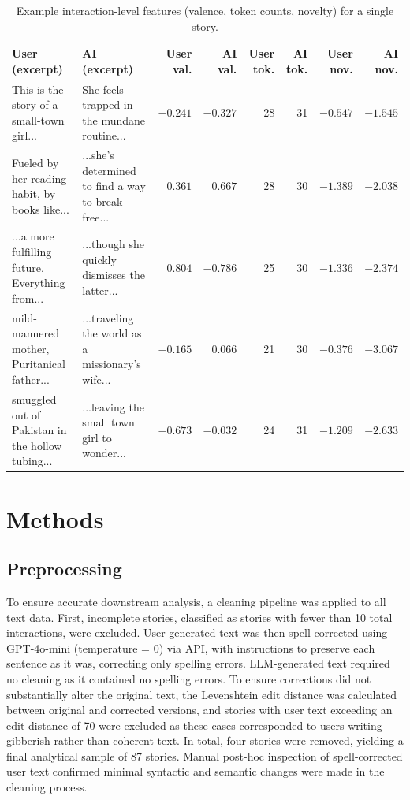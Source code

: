 \documentclass[11pt]{article}
\begin{document}
\begin{table}[t]
\centering
\scriptsize
\setlength{\tabcolsep}{3pt}
\renewcommand{\arraystretch}{1.15}
\begin{tabular}{p{} p{} r r r r r r}
\toprule
\textbf{User (excerpt)} & \textbf{AI (excerpt)} &
\textbf{User val.} & \textbf{AI val.} &
\textbf{User tok.} & \textbf{AI tok.} &
\textbf{User nov.} & \textbf{AI nov.} \\
\midrule
This is the story of a small-town girl... &
She feels trapped in the mundane routine... &
$-0.241$ & $-0.327$ & 28 & 31 & $-0.547$ & $-1.545$ \\
Fueled by her reading habit, by books like... &
...she's determined to find a way to break free... &
$0.361$ & $0.667$ & 28 & 30 & $-1.389$ & $-2.038$ \\
...a more fulfilling future. Everything from... &
...though she quickly dismisses the latter... &
$0.804$ & $-0.786$ & 25 & 30 & $-1.336$ & $-2.374$ \\
mild-mannered mother, Puritanical father... &
...traveling the world as a missionary's wife... &
$-0.165$ & $0.066$ & 21 & 30 & $-0.376$ & $-3.067$ \\
smuggled out of Pakistan in the hollow tubing... &
...leaving the small town girl to wonder... &
$-0.673$ & $-0.032$ & 24 & 31 & $-1.209$ & $-2.633$ \\
\bottomrule
\end{tabular}
\caption{Example interaction-level features (valence, token counts, novelty) for a single story.}
\label{tab:example_interaction_features}
\end{table}

\section{Methods}
\subsection{Preprocessing}
To ensure accurate downstream analysis, a cleaning pipeline was applied to all text data. First, incomplete stories, classified as stories with fewer than 10 total interactions, were excluded. User-generated text was then spell-corrected using GPT-4o-mini (temperature = 0) via API, with instructions to preserve each sentence as it was, correcting only spelling errors. LLM-generated text required no cleaning as it contained no spelling errors. To ensure corrections did not substantially alter the original text, the Levenshtein edit distance was calculated between original and corrected versions, and stories with user text exceeding an edit distance of 70 were excluded as these cases corresponded to users writing gibberish rather than coherent  text. In total, four stories were removed, yielding a final analytical sample of 87 stories. Manual post-hoc inspection of spell-corrected user text confirmed minimal syntactic and semantic changes were made in the cleaning process.
\end{document}
